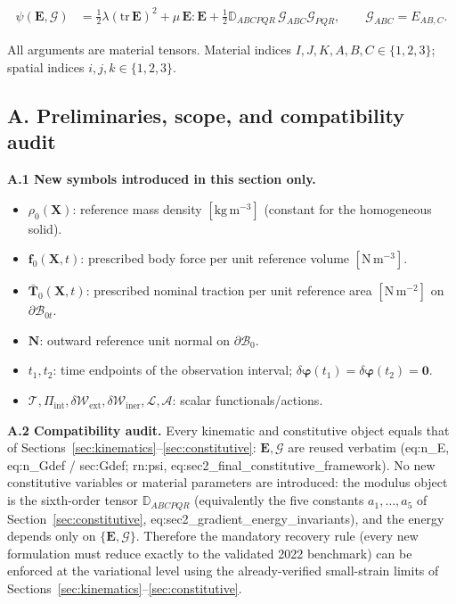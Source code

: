 \documentclass[11pt]{article}
\begin{document}
\begin{align}
\psi(\mathbf{E},\bm{\mathcal{G}})
&= \tfrac12\lambda(\mathrm{tr}\,\mathbf{E})^{2}
   +\mu\,\mathbf{E}:\mathbf{E}
   +\tfrac12\mathbb{D}_{ABCPQR}\,\mathcal{G}_{ABC}\mathcal{G}_{PQR},
\qquad \mathcal{G}_{ABC}=E_{AB,C}.
\label{rn:psi}
\end{align}

All arguments are material tensors. Material indices $I,J,K,A,B,C\in\{1,2,3\}$; spatial indices $i,j,k\in\{1,2,3\}$.

\subsection{A. Preliminaries, scope, and compatibility audit}

\textbf{A.1 New symbols introduced in this section only.}

\begin{itemize}
\item $\rho_{0}(\mathbf{X})$: reference mass density $[\mathrm{kg\,m^{-3}}]$ (constant for the homogeneous solid).

\item $\mathbf{f}_{0}(\mathbf{X},t)$: prescribed body force per unit reference volume $[\mathrm{N\,m^{-3}}]$.

\item $\bar{\mathbf{T}}_{0}(\mathbf{X},t)$: prescribed nominal traction per unit reference area $[\mathrm{N\,m^{-2}}]$ on $\partial\mathcal{B}_{0t}$.

\item $\mathbf{N}$: outward reference unit normal on $\partial\mathcal{B}_{0}$.

\item $t_{1},t_{2}$: time endpoints of the observation interval; $\delta\boldsymbol{\varphi}(t_{1})=\delta\boldsymbol{\varphi}(t_{2})=\mathbf{0}$.

\item $\mathcal{T},\Pi_{\mathrm{int}},\delta\mathcal{W}_{\mathrm{ext}},\delta\mathcal{W}_{\mathrm{iner}},\mathcal{L},\mathcal{A}$: scalar functionals/actions.
\end{itemize}

\textbf{A.2 Compatibility audit.} Every kinematic and constitutive object equals that of Sections~\ref{sec:kinematics}--\ref{sec:constitutive}: $\mathbf{E},\bm{\mathcal{G}}$ are reused verbatim (eq:n\_E, eq:n\_Gdef / sec:Gdef; rn:psi, eq:sec2\_final\_constitutive\_framework). No new constitutive variables or material parameters are introduced: the modulus object is the sixth-order tensor $\mathbb{D}_{ABCPQR}$ (equivalently the five constants $a_{1},\ldots,a_{5}$ of Section~\ref{sec:constitutive}, eq:sec2\_gradient\_energy\_invariants), and the energy depends only on $\{\mathbf{E},\bm{\mathcal{G}}\}$. Therefore the mandatory recovery rule (every new formulation must reduce exactly to the validated 2022 benchmark) can be enforced at the variational level using the already-verified small-strain limits of Sections~\ref{sec:kinematics}--\ref{sec:constitutive}.
\end{document}
